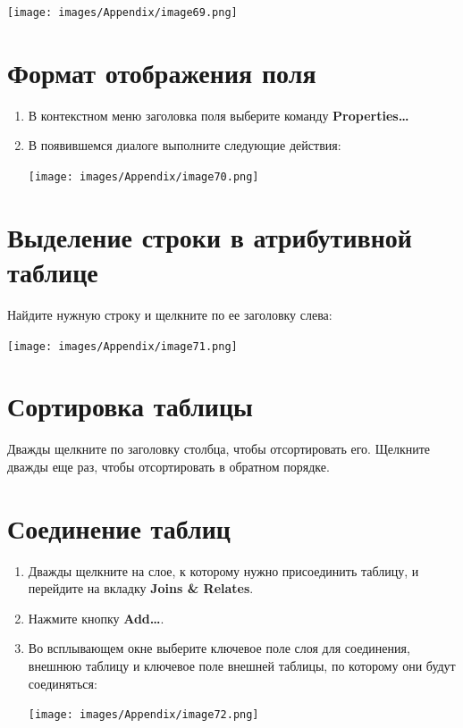 \documentclass[12pt,]{book}
\begin{document}
\texttt{[image: images/Appendix/image69.png]}

\hypertarget{section-36}{%
\section{Формат отображения поля}\label{section-36}}

\begin{enumerate}
\def\labelenumi{\arabic{enumi}.}
\item
  В контекстном меню заголовка поля выберите команду \textbf{Properties\ldots{}}
\item
  В появившемся диалоге выполните следующие действия:

  \texttt{[image: images/Appendix/image70.png]}
\end{enumerate}

\hypertarget{section-37}{%
\section{Выделение строки в атрибутивной таблице}\label{section-37}}

Найдите нужную строку и щелкните по ее заголовку слева:

\texttt{[image: images/Appendix/image71.png]}

\hypertarget{section-38}{%
\section{Сортировка таблицы}\label{section-38}}

Дважды щелкните по заголовку столбца, чтобы отсортировать его. Щелкните дважды еще раз, чтобы отсортировать в обратном порядке.

\hypertarget{section-39}{%
\section{Соединение таблиц}\label{section-39}}

\begin{enumerate}
\def\labelenumi{\arabic{enumi}.}
\item
  Дважды щелкните на слое, к которому нужно присоединить таблицу, и перейдите на вкладку \textbf{Joins \& Relates}.
\item
  Нажмите кнопку \textbf{Add\ldots{}}.
\item
  Во всплывающем окне выберите ключевое поле слоя для соединения, внешнюю таблицу и ключевое поле внешней таблицы, по которому они будут соединяться:

  \texttt{[image: images/Appendix/image72.png]}
\end{enumerate}
\end{document}
